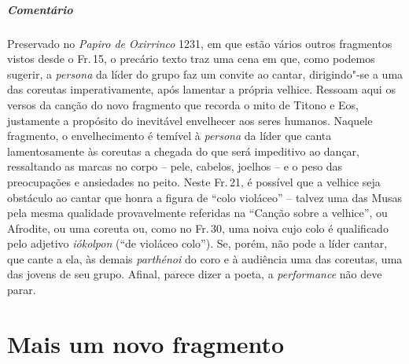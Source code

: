 {\paragraph{Comentário} Preservado no \emph{Papiro de Oxirrinco} 1231, em que estão vários
outros fragmentos vistos desde o Fr.\,15, o precário texto traz uma
cena em que, como podemos sugerir, a \emph{persona} da líder do grupo
faz um convite ao cantar, dirigindo"-se a uma das coreutas
imperativamente, após lamentar a própria velhice. Ressoam aqui os versos
da canção do novo fragmento que recorda o mito de Titono e Eos,
justamente a propósito do inevitável envelhecer aos seres humanos.
Naquele fragmento, o envelhecimento é temível à \emph{persona} da líder que canta lamentosamente às
coreutas a chegada do que será impeditivo ao dançar, ressaltando as
marcas no corpo -- pele, cabelos, joelhos -- e o peso das
preocupações e ansiedades no peito. Neste Fr.\,21, é possível que a
velhice seja obstáculo ao cantar que honra a figura de ``colo violáceo''
-- talvez uma das Musas pela mesma qualidade provavelmente referidas na
``Canção sobre a velhice'', ou Afrodite, ou uma coreuta
ou, como no Fr.\,30, uma noiva cujo colo é qualificado pelo adjetivo \textit{iókolpon} (``de violáceo colo''). Se, porém, não pode a líder cantar, que
cante a ela, às demais \emph{parthénoi} do coro e à audiência uma das
coreutas, uma das jovens de seu grupo. Afinal, parece dizer a poeta, a
\emph{performance} não deve parar.}



\chapter{Mais um novo fragmento}

